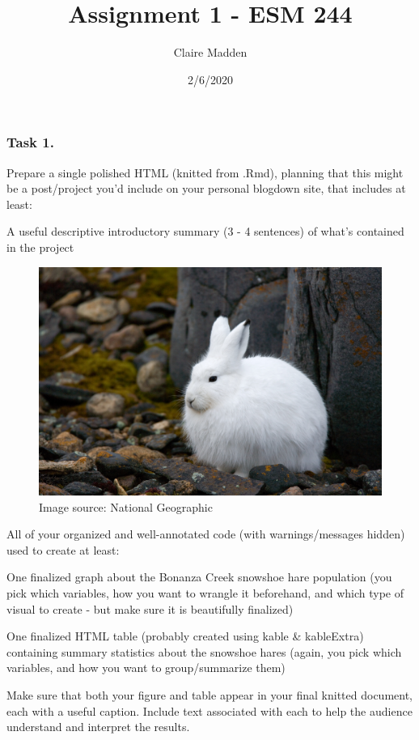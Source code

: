 \documentclass[]{article}
\title{Assignment 1 - ESM 244}
\author{Claire Madden}
\date{2/6/2020}
\begin{document}
\maketitle

\subsubsection{Task 1.}\label{task-1.}

Prepare a single polished HTML (knitted from .Rmd), planning that this
might be a post/project you'd include on your personal blogdown site,
that includes at least:

A useful descriptive introductory summary (3 - 4 sentences) of what's
contained in the project

\begin{figure}
\centering
\includegraphics{81736.jpg}
\caption{Image source: National Geographic}
\end{figure}

All of your organized and well-annotated code (with warnings/messages
hidden) used to create at least:

One finalized graph about the Bonanza Creek snowshoe hare population
(you pick which variables, how you want to wrangle it beforehand, and
which type of visual to create - but make sure it is beautifully
finalized)

One finalized HTML table (probably created using kable \& kableExtra)
containing summary statistics about the snowshoe hares (again, you pick
which variables, and how you want to group/summarize them)

Make sure that both your figure and table appear in your final knitted
document, each with a useful caption. Include text associated with each
to help the audience understand and interpret the results.
\end{document}
